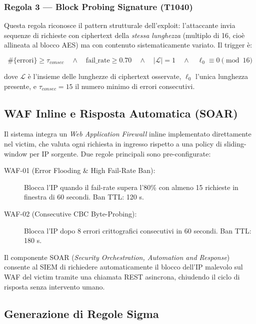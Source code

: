\documentclass[12pt,a4paper]{article}
\begin{document}
\subsubsection{Regola 3 — Block Probing Signature (T1040)}

Questa regola riconosce il pattern strutturale dell'exploit: l'attaccante invia
sequenze di richieste con ciphertext della \emph{stessa lunghezza} (multiplo di 16,
cioè allineata al blocco AES) ma con contenuto sistematicamente variato. Il trigger è:

\[
  \#\{\text{errori}\} \geq \tau_{consec} \quad \land \quad
  \text{fail\_rate} \geq 0.70 \quad \land \quad
  |\mathcal{L}| = 1 \quad \land \quad
  \ell_0 \equiv 0 \pmod{16}
\]

dove $\mathcal{L}$ è l'insieme delle lunghezze di ciphertext osservate, $\ell_0$
l'unica lunghezza presente, e $\tau_{consec} = 15$ il numero minimo di errori
consecutivi.

\subsection{WAF Inline e Risposta Automatica (SOAR)}

Il sistema integra un \emph{Web Application Firewall} inline implementato direttamente
nel victim, che valuta ogni richiesta in ingresso rispetto a una policy di sliding-window
per IP sorgente. Due regole principali sono pre-configurate:

\begin{description}
  \item[WAF-01 (Error Flooding \& High Fail-Rate Ban):] Blocca l'IP quando il fail-rate
        supera l'80\% con almeno 15 richieste in finestra di 60 secondi. Ban TTL: 120 s.
  \item[WAF-02 (Consecutive CBC Byte-Probing):] Blocca l'IP dopo 8 errori crittografici
        consecutivi in 60 secondi. Ban TTL: 180 s.
\end{description}

Il componente SOAR (\emph{Security Orchestration, Automation and Response}) consente
al SIEM di richiedere automaticamente il blocco dell'IP malevolo sul WAF del victim
tramite una chiamata REST asincrona, chiudendo il ciclo di risposta senza intervento
umano.

\subsection{Generazione di Regole Sigma}
\end{document}
